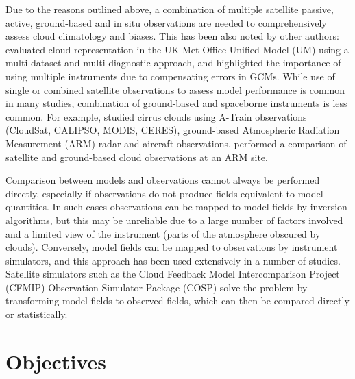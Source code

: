 Due to the reasons outlined above, a combination of multiple satellite passive, active,
ground-based and in situ observations are needed to comprehensively assess
cloud climatology and biases. This has been also noted by other authors:
\cite{williams2017} evaluated cloud representation in the UK Met Office
Unified Model (UM) using a multi-dataset and multi-diagnostic approach, and
highlighted the
importance of using multiple instruments due to compensating errors in GCMs.
While use of single or combined satellite observations to assess model
performance is common in many studies,
combination of ground-based and spaceborne instruments is less common.
For example, \cite{muhlbauer2015} studied cirrus clouds using A-Train
observations (CloudSat, CALIPSO, MODIS, CERES), ground-based
Atmospheric Radiation Measurement (ARM) radar and aircraft observations.
\cite{zhang2017} performed a comparison of satellite and ground-based cloud
observations at an ARM site.

Comparison between models and observations cannot always be performed directly,
especially if observations do not produce fields equivalent to model quantities.
In such cases observations can be mapped to model fields by inversion algorithms,
but this may be unreliable
due to a large number of factors involved and a limited view of the instrument
(parts of the atmosphere obscured by clouds).
Conversely, model fields can be mapped to observations by instrument simulators,
and this approach has been used extensively in a number of studies.
Satellite simulators such as the Cloud Feedback Model Intercomparison Project (CFMIP) Observation Simulator Package (COSP)
\citep{bodas-salcedo2011} solve the problem
by transforming model fields to observed fields, which can then
be compared directly or statistically.

\section{Objectives}
\label{sec:objectives}

